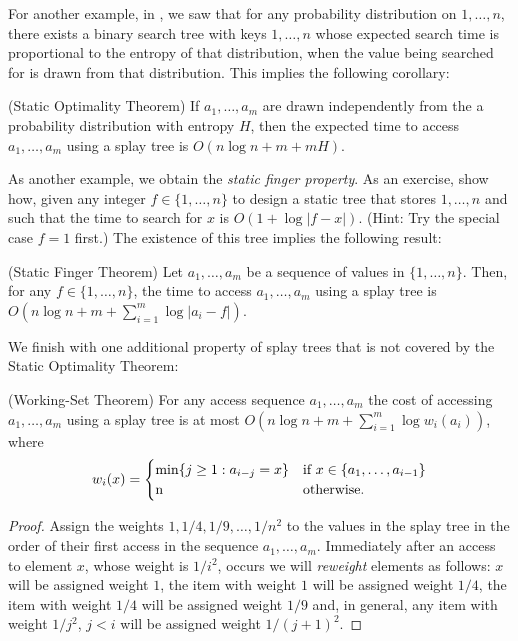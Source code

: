 {For another example, in , we saw that for any
probability distribution on $1,\ldots,n$, there exists a binary search
tree with keys $1,\ldots,n$ whose expected search time is proportional
to the entropy of that distribution, when the value being searched for
is drawn from that distribution.  This implies the following corollary:

\begin{cor}(Static Optimality Theorem)
If $a_1,\ldots,a_m$ are drawn independently from the a probability
distribution with entropy $H$, then the expected time to access
$a_1,\ldots,a_m$ using a splay tree is $O(n\log n + m + mH)$.
\end{cor}

As another example, we obtain the \emph{static finger property}. As an
exercise, show how, given any integer $f\in\{1,\ldots,n\}$ to design a
static tree that stores $1,\ldots,n$ and such that the time to search
for $x$ is $O(1+\log|f-x|)$. (Hint: Try the special case $f=1$ first.)
The existence of this tree implies the following result:

\begin{cor}(Static Finger Theorem)
Let $a_1,\ldots,a_m$ be a sequence of values in $\{1,\ldots,n\}$.  Then,
for any $f\in\{1,\ldots,n\}$, the time to access $a_1,\ldots,a_m$ using
a splay tree is $O(n\log n + m + \sum_{i=1}^m \log|a_i-f|)$.
\end{cor}

We finish with one additional property of splay trees that is not covered by the Static Optimality Theorem: 

\begin{thm}(Working-Set Theorem)
For any access sequence $a_1,\ldots,a_m$
the cost of accessing $a_1,\ldots,a_m$ using a splay tree is at most
$O(n\log n + m + \sum_{i=1}^m\log w_i(a_i))$, where
\[
   w_i(x) = \begin{cases}
        \min\{j\ge 1 : a_{i-j}=x\} & \text{if $x\in\{a_1,\ldots,a_{i-1}\}$} \\
        $n$ & \text{otherwise.}
       \end{cases}
\]
\end{thm}

\begin{proof}
Assign the weights $1, 1/4, 1/9, \ldots, 1/n^2$ to the values in the splay tree in the order of their first access in the sequence $a_1,\ldots,a_m$.  Immediately after an access to element $x$, whose weight is $1/i^2$, occurs we will \emph{reweight} elements as follows: $x$ will be assigned weight $1$, the item with weight $1$ will be assigned weight $1/4$, the item with weight $1/4$ will be assigned weight $1/9$ and, in general, any item with weight $1/j^2$, $j<i$ will be assigned weight $1/(j+1)^2$.


\end{proof}}
